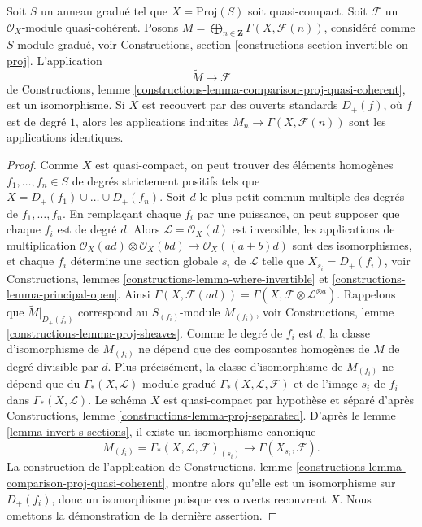 \begin{lemma}
\label{lemma-proj-quasi-coherent}
Soit $S$ un anneau gradué tel que $X = \text{Proj}(S)$ soit quasi-compact.
Soit $\mathcal{F}$ un $\mathcal{O}_X$-module quasi-cohérent. Posons
$M = \bigoplus_{n \in \mathbf{Z}} \Gamma(X, \mathcal{F}(n))$,
considéré comme $S$-module gradué,
voir Constructions, section \ref{constructions-section-invertible-on-proj}.
L'application
$$
\widetilde{M} \longrightarrow \mathcal{F}
$$
de Constructions, lemme
\ref{constructions-lemma-comparison-proj-quasi-coherent},
est un isomorphisme.
Si $X$ est recouvert par des ouverts standards $D_+(f)$, où $f$ est de degré $1$,
alors les applications induites
$M_n \to \Gamma(X, \mathcal{F}(n))$ sont les applications identiques.
\end{lemma}

\begin{proof}
Comme $X$ est quasi-compact, on peut trouver des éléments homogènes
$f_1, \ldots, f_n \in S$ de degrés strictement positifs tels que
$X = D_+(f_1) \cup \ldots \cup D_+(f_n)$. Soit $d$ le
plus petit commun multiple des degrés de $f_1, \ldots, f_n$.
En remplaçant chaque $f_i$ par une puissance, on peut supposer que chaque
$f_i$ est de degré $d$. Alors $\mathcal{L} = \mathcal{O}_X(d)$ est
inversible, les applications de multiplication
$\mathcal{O}_X(ad) \otimes \mathcal{O}_X(bd) \to \mathcal{O}_X((a + b)d)$
sont des isomorphismes, et chaque $f_i$ détermine une section globale $s_i$
de $\mathcal{L}$ telle que $X_{s_i} = D_+(f_i)$,
voir Constructions, lemmes \ref{constructions-lemma-where-invertible} et
\ref{constructions-lemma-principal-open}.
Ainsi $\Gamma(X, \mathcal{F}(ad)) =
\Gamma(X, \mathcal{F} \otimes \mathcal{L}^{\otimes a})$.
Rappelons que $\widetilde{M}|_{D_{+}(f_i)}$ correspond au
$S_{(f_i)}$-module $M_{(f_i)}$,
voir Constructions, lemme \ref{constructions-lemma-proj-sheaves}.
Comme le degré de $f_i$ est $d$, la classe d'isomorphisme de
$M_{(f_i)}$ ne dépend que des composantes homogènes de $M$ de
degré divisible par $d$. Plus précisément, la classe d'isomorphisme de
$M_{(f_i)}$ ne dépend que du $\Gamma_*(X, \mathcal{L})$-module gradué
$\Gamma_*(X, \mathcal{L}, \mathcal{F})$
et de l'image $s_i$ de $f_i$ dans $\Gamma_*(X, \mathcal{L})$.
Le schéma $X$ est quasi-compact par hypothèse et
séparé d'après Constructions, lemme \ref{constructions-lemma-proj-separated}.
D'après le lemme \ref{lemma-invert-s-sections}, il existe un isomorphisme canonique
$$
M_{(f_i)} = \Gamma_*(X, \mathcal{L}, \mathcal{F})_{(s_i)} \to
\Gamma(X_{s_i}, \mathcal{F}).
$$
La construction de l'application de Constructions, lemme
\ref{constructions-lemma-comparison-proj-quasi-coherent},
montre alors qu'elle est un isomorphisme sur $D_+(f_i)$,
donc un isomorphisme puisque ces ouverts recouvrent $X$. Nous omettons la
démonstration de la dernière assertion.
\end{proof}




